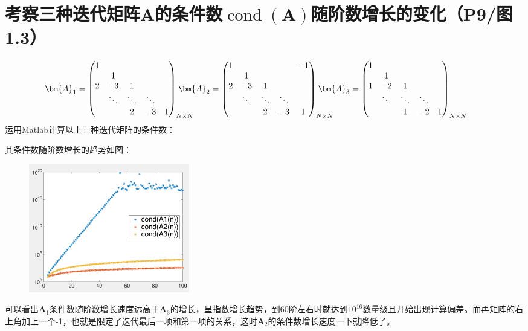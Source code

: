 \documentclass{homework}
\begin{document}
\section{考察三种迭代矩阵$\bm{A}$的条件数$\operatorname{cond}(\bm{A})$随阶数增长的变化（P9/图1.3）}
    $$\hspace{-2em}
    \bm{A}_1=\begin{pmatrix}
    1 & & & & \\
    & 1 & & & \\
    2 & -3 & 1 & & \\
    & \ddots & \ddots & \ddots & \\
    & & 2 & -3 & 1
    \end{pmatrix}_{N\times N}
    \hspace{-2em}
    \bm{A}_2=\begin{pmatrix}
    1 & & & & -1 \\
    & 1 & & & \\
    2 & -3 & 1 & & \\
    & \ddots & \ddots & \ddots & \\
    & & 2 & -3 & 1
    \end{pmatrix}_{N\times N}
    \hspace{-2em}
    \bm{A}_3=\begin{pmatrix}
    1 & & & & \\
    & 1 & & & \\
    1 & -2 & 1 & & \\
    & \ddots & \ddots & \ddots & \\
    & & 1 & -2 & 1
    \end{pmatrix}_{N\times N}$$
    运用Matlab计算以上三种迭代矩阵的条件数：
    
    其条件数随阶数增长的趋势如图：
    \begin{figure}[H]
    \includegraphics[width=7cm]{fig02.png}
    \centering
    \end{figure}
    可以看出$\bm{A}_1$条件数随阶数增长速度远高于$\bm{A}_3$的增长，呈指数增长趋势，到60阶左右时就达到$10^{16}$数量级且开始出现计算偏差。而再矩阵的右上角加上一个-1，也就是限定了迭代最后一项和第一项的关系，这时$\bm{A}_2$的条件数增长速度一下就降低了。
    \clearpage
\end{document}
